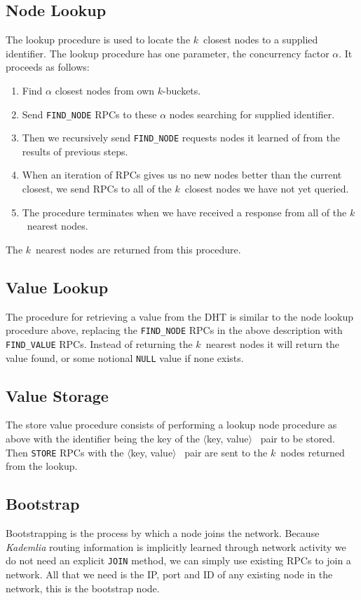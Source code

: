 \documentclass[12pt,notitlepage,a4paper]{report}
\newcommand{\kademlia}{\emph{Kademlia}}
\newcommand{\K}{$k$}
\begin{document}
	\subsection{Node Lookup}
	The lookup procedure is used to locate the \K~closest nodes to a supplied identifier. The lookup procedure has one parameter, the concurrency factor $\alpha$. It proceeds as follows:
	\begin{enumerate}
		\item Find $\alpha$ closest nodes from own \K-buckets.
		\item Send \texttt{FIND\_NODE} RPCs to these $\alpha$ nodes searching for supplied identifier.
		\item Then we recursively send \texttt{FIND\_NODE} requests nodes it learned of from the results of previous steps.
		\item When an iteration of RPCs gives us no new nodes better than the current closest, we send RPCs to all of the \K~closest nodes we have not yet queried.
		\item The procedure terminates when we have received a response from all of the \K~nearest nodes.
	\end{enumerate}
	The \K~nearest nodes are returned from this procedure.
	
	\subsection{Value Lookup}
	The procedure for retrieving a value from the DHT is similar to the node lookup procedure above, replacing the \texttt{FIND\_NODE} RPCs in the above description with \texttt{FIND\_VALUE} RPCs. Instead of returning the \K~nearest nodes it will return the value found, or some notional \texttt{NULL} value if none exists.
	
	\subsection{Value Storage}
	The store value procedure consists of performing a lookup node procedure as above with the identifier being the key of the $\langle$key, value$\rangle$~ pair to be stored. Then \texttt{STORE} RPCs with the $\langle$key, value$\rangle$~ pair are sent to the \K~nodes returned from the lookup.
	
	\subsection{Bootstrap}
	Bootstrapping is the process by which a node joins the network. Because \kademlia{} routing information is implicitly learned through network activity we do not need an explicit \texttt{JOIN} method, we can simply use existing RPCs to join a network. All that we need is the IP, port and ID of any existing node in the network, this is the bootstrap node.
	
\end{document}
